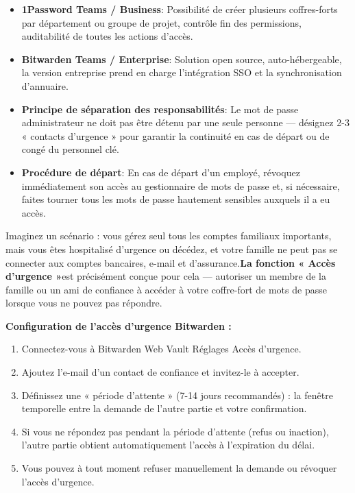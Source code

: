 
\begin{itemize}
  \item \textbf{1Password Teams / Business}: Possibilité de créer plusieurs coffres-forts par département ou groupe de projet, contrôle fin des permissions, auditabilité de toutes les actions d'accès.
  \item \textbf{Bitwarden Teams / Enterprise}: Solution open source, auto-hébergeable, la version entreprise prend en charge l'intégration SSO et la synchronisation d'annuaire.
  \item \textbf{Principe de séparation des responsabilités}: Le mot de passe administrateur ne doit pas être détenu par une seule personne — désignez 2-3 « contacts d'urgence » pour garantir la continuité en cas de départ ou de congé du personnel clé.
  \item \textbf{Procédure de départ}: En cas de départ d'un employé, révoquez immédiatement son accès au gestionnaire de mots de passe et, si nécessaire, faites tourner tous les mots de passe hautement sensibles auxquels il a eu accès.
\end{itemize}


Imaginez un scénario : vous gérez seul tous les comptes familiaux importants, mais vous êtes hospitalisé d'urgence ou décédez, et votre famille ne peut pas se connecter aux comptes bancaires, e-mail et d'assurance.\textbf{La fonction « Accès d'urgence »}est précisément conçue pour cela — autoriser un membre de la famille ou un ami de confiance à accéder à votre coffre-fort de mots de passe lorsque vous ne pouvez pas répondre.

\textbf{Configuration de l'accès d'urgence Bitwarden :}

\begin{enumerate}
  \item Connectez-vous à Bitwarden Web Vault Réglages Accès d'urgence.
  \item Ajoutez l'e-mail d'un contact de confiance et invitez-le à accepter.
  \item Définissez une « période d'attente » (7-14 jours recommandés) : la fenêtre temporelle entre la demande de l'autre partie et votre confirmation.
  \item Si vous ne répondez pas pendant la période d'attente (refus ou inaction), l'autre partie obtient automatiquement l'accès à l'expiration du délai.
  \item Vous pouvez à tout moment refuser manuellement la demande ou révoquer l'accès d'urgence.
\end{enumerate}

